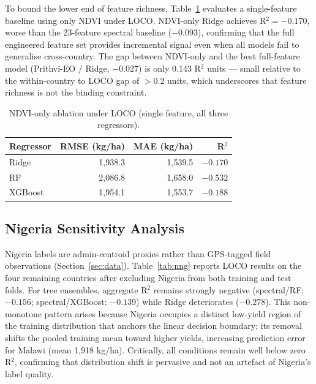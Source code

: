 \documentclass[journal]{IEEEtran}
\begin{document}
To bound the lower end of feature richness, Table~\ref{tab:ndvi}
evaluates a single-feature baseline using only NDVI under LOCO.
NDVI-only Ridge achieves R$^2 = -0.170$, worse than the 23-feature
spectral baseline ($-0.093$), confirming that the full engineered
feature set provides incremental signal even when all models fail
to generalise cross-country.
The gap between NDVI-only and the best full-feature model
(Prithvi-EO / Ridge, $-0.027$) is only 0.143 R$^2$ units —
small relative to the within-country to LOCO gap of $>0.2$ units,
which underscores that feature richness is not the binding constraint.

\begin{table}[!t]
  \centering
  \caption{NDVI-only ablation under LOCO (single feature, all three regressors).}
  \label{tab:ndvi}
  \begin{tabular}{lrrr}
    \toprule
    Regressor & RMSE (kg/ha) & MAE (kg/ha) & R$^2$ \\
    \midrule
    Ridge     & 1{,}938.3    & 1{,}539.5   & $-0.170$ \\
    RF        & 2{,}086.8    & 1{,}658.0   & $-0.532$ \\
    XGBoost   & 1{,}954.1    & 1{,}553.7   & $-0.188$ \\
    \bottomrule
  \end{tabular}
\end{table}

\subsection{Nigeria Sensitivity Analysis}

Nigeria labels are admin-centroid proxies rather than GPS-tagged field
observations (Section~\ref{sec:data}).
Table~\ref{tab:nng} reports LOCO results on the four remaining countries
after excluding Nigeria from both training and test folds.
For tree ensembles, aggregate R$^2$ remains strongly negative
(spectral/RF: $-0.156$; spectral/XGBoost: $-0.139$) while Ridge
deteriorates ($-0.278$).
This non-monotone pattern arises because Nigeria occupies a distinct
low-yield region of the training distribution that anchors the linear
decision boundary; its removal shifts the pooled training mean toward
higher yields, increasing prediction error for Malawi (mean 1{,}918 kg/ha).
Critically, all conditions remain well below zero R$^2$, confirming that
distribution shift is pervasive and not an artefact of Nigeria's
label quality.
\end{document}
